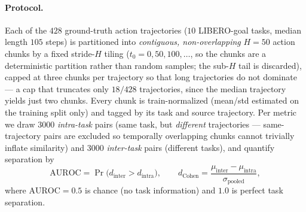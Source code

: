 \documentclass[11pt]{article}
\begin{document}
\paragraph{Protocol.} Each of the $428$ ground-truth action trajectories ($10$ LIBERO-goal tasks,
median length $105$ steps) is partitioned into \emph{contiguous, non-overlapping} $H{=}50$ action
chunks by a fixed stride-$H$ tiling ($t_0 = 0, 50, 100, \dots$, so the chunks are a deterministic
partition rather than random samples; the sub-$H$ tail is discarded), capped at three chunks per
trajectory so that long trajectories do not dominate --- a cap that truncates only $18/428$
trajectories, since the median trajectory yields just two chunks. Every chunk is train-normalized
(mean/std estimated on the training split only) and tagged by its task and source trajectory. Per
metric we draw $3000$ \emph{intra-task} pairs (same task, but \emph{different} trajectories ---
same-trajectory pairs are excluded so temporally overlapping chunks cannot trivially inflate
similarity) and $3000$ \emph{inter-task} pairs (different tasks), and quantify separation by
\begin{equation}
  \mathrm{AUROC} = \Pr\!\big(d_{\text{inter}} > d_{\text{intra}}\big),
  \qquad
  d_{\text{Cohen}} = \frac{\mu_{\text{inter}}-\mu_{\text{intra}}}{\sigma_{\text{pooled}}},
\end{equation}
where $\mathrm{AUROC}=0.5$ is chance (no task information) and $1.0$ is perfect task separation.
\end{document}
